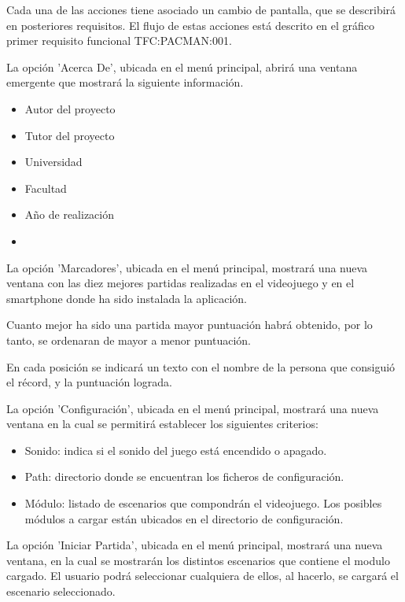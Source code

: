 \begin{description}
{Cada una de las acciones tiene asociado un cambio de pantalla, que se describirá en posteriores requisitos. El flujo de estas acciones está descrito en el gráfico primer requisito funcional TFC:PACMAN:001.
}

 {La opción 'Acerca De', ubicada en el menú principal, abrirá una ventana emergente que mostrará la siguiente información.
\begin{multicols}{2}
	\begin{itemize}
	\item Autor del proyecto
	\item Tutor del proyecto
	\item Universidad
	\end{itemize}
	\begin{itemize}
	\item Facultad
	\item Año de realización
	\item []
	\end{itemize}
\end{multicols}
}

 {La opción 'Marcadores', ubicada en el menú principal, mostrará una nueva ventana con las diez mejores partidas realizadas en el videojuego y en el smartphone donde ha sido instalada la aplicación. 

Cuanto mejor ha sido una partida mayor puntuación habrá obtenido, por lo tanto, se ordenaran de mayor a menor puntuación. 

En cada posición se indicará un texto con el nombre de la persona que consiguió el récord, y la puntuación lograda.
}

 {La opción 'Configuración', ubicada en el menú principal, mostrará una nueva ventana en la cual se permitirá establecer los siguientes criterios:
\begin{itemize}
\item Sonido: indica si el sonido del juego está encendido o apagado.
\item Path: directorio donde se encuentran los ficheros de configuración.
\item Módulo: listado de escenarios que compondrán el videojuego. Los posibles módulos a cargar están ubicados en el directorio de configuración.
\end{itemize} 
}

 {La opción 'Iniciar Partida', ubicada en el menú principal, mostrará una nueva ventana, en la cual se mostrarán los distintos escenarios que contiene el modulo cargado. 
El usuario podrá seleccionar cualquiera de ellos, al hacerlo, se cargará el escenario seleccionado.
}


\end{description}
